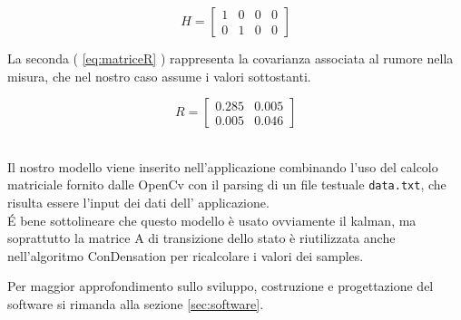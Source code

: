 \begin{equation} \label{eq:matriceH}
 H = \begin{bmatrix} 
1 & 0 & 0 & 0\\
0 & 1 & 0 & 0
\end{bmatrix}
\end{equation}


La seconda ( \ref{eq:matriceR} ) rappresenta la covarianza associata al rumore nella misura, che nel nostro caso assume i valori sottostanti.


\begin{equation}\label{eq:matriceR}
 R = \begin{bmatrix} 
0.285 & 0.005\\
0.005 & 0.046
\end{bmatrix} 
\end{equation}

~\\
Il nostro modello viene inserito nell'applicazione combinando l'uso del calcolo matriciale fornito dalle OpenCv con il parsing di un file testuale \texttt{data.txt}, che risulta essere l'input dei dati dell' applicazione.\\

\'E bene sottolineare che questo modello è usato ovviamente il kalman, ma soprattutto la matrice A di transizione dello stato è riutilizzata anche nell'algoritmo ConDensation per ricalcolare i valori dei samples.


Per maggior approfondimento sullo sviluppo, costruzione e progettazione del software si rimanda alla sezione \ref{sec:software}.
